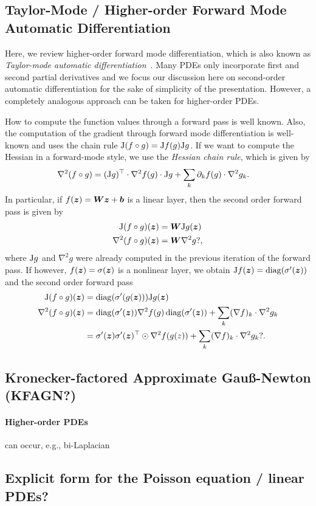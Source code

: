 \subsection{Taylor-Mode  / Higher-order Forward Mode Automatic Differentiation} \label{sec:taylor-mode-AD}

Here, we review higher-order forward mode differentiation, which is also known as \emph{Taylor-mode automatic differentiation}~\citep{griewank1996algorithm, griewank2008evaluating, bettencourt2019taylor}. 
Many PDEs only incorporate first and second partial derivatives and we focus our discussion here on second-order automatic differentiation for the sake of simplicity of the presentation. 
However, a completely analogous approach can be taken for higher-order PDEs. 

How to compute the function values through a forward pass is well known. 
Also, the computation of the gradient through forward mode differentiation is well-known and uses the chain rule $\mathrm{J} (f\circ g) = \mathrm{J} f (g) \mathrm{J} g$. 
If we want to compute the Hessian in a forward-mode style, we use the \emph{Hessian chain rule}, which is given by 
\begin{align} 
       \nabla^2 (f\circ g) & = (\mathrm{J} g)^\top\cdot \nabla^2 f(g) \cdot \mathrm{J} g + \sum_{k} \partial_{k} f(g) \cdot \nabla^2 g_k. 
\end{align}
In particular, if $f({\bm{z}}) = {\bm{W}} {\bm{z}} + {\bm{b}}$ is a linear layer, then the second order forward pass is given by 
\begin{align}
    \mathrm{J} (f\circ g)({\bm{z}}) & = {\bm{W}} \mathrm{J} g({\bm{z}})  \\ 
       \nabla^2 (f\circ g)({\bm{z}}) & = {\bm{W}}   \nabla^2 g?, 
\end{align}
where $\mathrm{J} g$ and $\nabla^2 g$ were already computed in the previous iteration of the forward pass. 
If however, $f({\bm{z}}) = \sigma({\bm{z}})$ is a nonlinear layer, we obtain $\mathrm{J} f({\bm{z}}) = \operatorname{diag}(\sigma'({\bm{z}}))$ and the second order forward pass 
\begin{align}
    \mathrm{J} (f\circ g)({\bm{z}}) & =  \operatorname{diag}(\sigma'(g({\bm{z}}))) \mathrm{J} g({\bm{z}})
    \\ 
    \nabla^2 (f\circ g)({\bm{z}}) & = \operatorname{diag}(\sigma'({\bm{z}})) \nabla^2 f(g) \operatorname{diag}(\sigma'({\bm{z}})) + \sum_{k} (\nabla f)_k \cdot \nabla^2 g_k 
    \\ & = \sigma'({\bm{z}})\sigma'({\bm{z}})^\top \odot \nabla^2 f(g(z)) + \sum_{k} (\nabla f)_k \cdot \nabla^2 g_k ? . 
\end{align}


\subsection{Kronecker-factored Approximate Gauß-Newton (KFAGN?)}\label{sec:KFAGN}

\paragraph{Higher-order PDEs}
can occur, e.g., bi-Laplacian


\subsection{Explicit form for the Poisson equation / linear PDEs?} 


